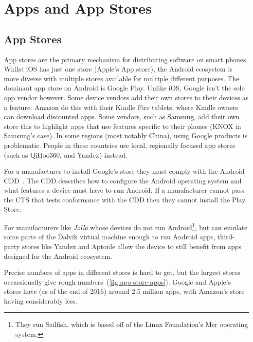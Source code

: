 \documentclass[thesis.tex]{subfiles}
\begin{document}
\chapter{Apps and App Stores}
\label{chap:apps-and-stores}

\section{App Stores}

App stores are the primary mechanism for distributing software on
smart phones.  Whilst iOS has just one store (Apple's App store), the
Android ecosystem is more diverse with multiple stores available for
multiple different purposes.  The dominant app store on Android is
Google Play.  Unlike iOS, Google isn't the sole app vendor however.
Some device vendors add their own stores to their devices as a
feature: Amazon do this with their Kindle Fire tablets, where Kindle
owners can download discounted apps.  Some vendors, such as Samsung,
add their own store this to highlight apps that use features specific
to their phones (KNOX in Samsung's case).  In some regions (most
notably China), using Google products is problematic. People in these
countries use local, regionally focused app stores (such as QiHoo360,
and Yandex) instead.

For a manufacturer to install Google's store they must comply with the
Android \ac{CDD}~\cite{google_android_2016}.  The \ac{CDD} describes
how to configure the Android operating system and what features a
device must have to run Android.  If a manufacturer cannot pass the
\ac{CTS} that tests conformance with the \ac{CDD} then they cannot
install the Play Store.

For manufacturers like \emph{Jolla} whose devices do not run
Android\footnote{They run Sailfish, which is based off of the Linux
Foundation's Mer operating system.}, but can emulate some parts of the
Dalvik virtual machine enough to run Android apps, third-party stores
like Yandex and Aptoide allow the device to still benefit from apps
designed for the Android ecosystem.

Precise numbers of apps in different stores is hard to get, but the
largest stores occassionally give rough
numbers~(\autoref{fig:app-store-apps}).  Google and Apple's stores
have (as of the end of 2016) around 2.5 million apps, with Amazon's
store having considerably less.
\end{document}
